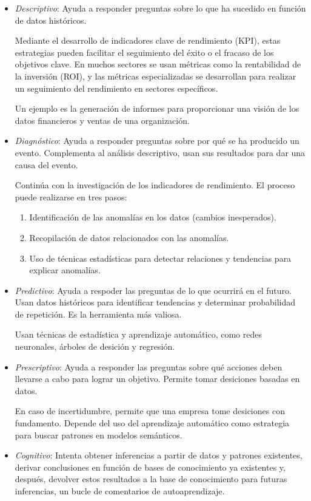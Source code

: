 \documentclass[12pt]{report}
\newcounter{it}
\theoremstyle{largebreak}
\begin{document}
    \begin{itemize}
        \item \textit{Descriptivo}: Ayuda a responder preguntas sobre lo que ha sucedido en función de datos históricos.
        
        Mediante el desarrollo de indicadores clave de rendimiento (KPI), estas estrategias pueden facilitar el seguimiento del éxito o el fracaso de los objetivos clave. En muchos sectores se usan métricas como la rentabilidad de la inversión (ROI), y las métricas especializadas se desarrollan para realizar un seguimiento del rendimiento en sectores específicos.

        Un ejemplo es la generación de informes para proporcionar una visión de los datos financieros y ventas de una organización.

        \item \textit{Diagnóstico}: Ayuda a responder preguntas sobre por qué se ha producido un evento. Complementa al análisis descriptivo, usan sus resultados para dar una causa del evento.
        
        Continúa con la investigación de los indicadores de rendimiento. El proceso puede realizarse en tres pasos:

        \begin{enumerate}
            \item Identificación de las anomalías en los datos (cambios inesperados).
            \item Recopilación de datos relacionados con las anomalías.
            \item Uso de técnicas estadísticas para detectar relaciones y tendencias para explicar anomalías.
        \end{enumerate}

        \item \textit{Predictivo}: Ayuda a respoder las preguntas de lo que ocurrirá en el futuro. Usan datos históricos para identificar tendencias y determinar probabilidad de repetición. Es la herramienta más valiosa.
        
        Usan técnicas de estadística y aprendizaje automático, como redes neuronales, árboles de desición y regresión.
        \item \textit{Prescriptivo}: Ayuda a responder las preguntas sobre qué acciones deben llevarse a cabo para lograr un objetivo. Permite tomar desiciones basadas en datos.
        
        En caso de incertidumbre, permite que una empresa tome desiciones con fundamento. Depende del uso del aprendizaje automático como estrategia para buscar patrones en modelos semánticos.
        \item \textit{Cognitivo}: Intenta obtener inferencias a partir de datos y patrones existentes, derivar conclusiones en función de bases de conocimiento ya existentes y, después, devolver estos resultados a la base de conocimiento para futuras inferencias, un bucle de comentarios de autoaprendizaje.
        

\end{itemize}
\end{document}
